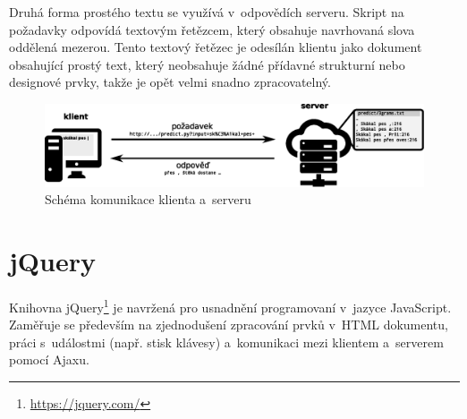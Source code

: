 \documentclass[a4paper,11pt,openany]{book} %
\begin{document}
Druhá forma prostého textu se využívá v~odpovědích serveru. Skript na požadavky odpovídá textovým řetězcem, který obsahuje navrhovaná slova oddělená mezerou. Tento textový řetězec je odesílán klientu jako dokument obsahující prostý text, který neobsahuje žádné přídavné strukturní nebo designové prvky, takže je opět velmi snadno zpracovatelný.

\begin{figure}[h]
	\centering
	\includegraphics[width=1.0\textwidth]{client-server-schema1.eps}
	\caption{Schéma komunikace klienta a~serveru\protect\footnotemark}
	\label{fig:clientserver}
\end{figure}


\section{jQuery}

Knihovna jQuery\footnote{\url{https://jquery.com/}} je navržená pro usnadnění programovaní v~jazyce JavaScript. Zaměřuje se především na zjednodušení zpracování prvků v~HTML dokumentu, práci s~událostmi (např. stisk klávesy) a~komunikaci mezi klientem a~serverem pomocí Ajaxu.
\end{document}

